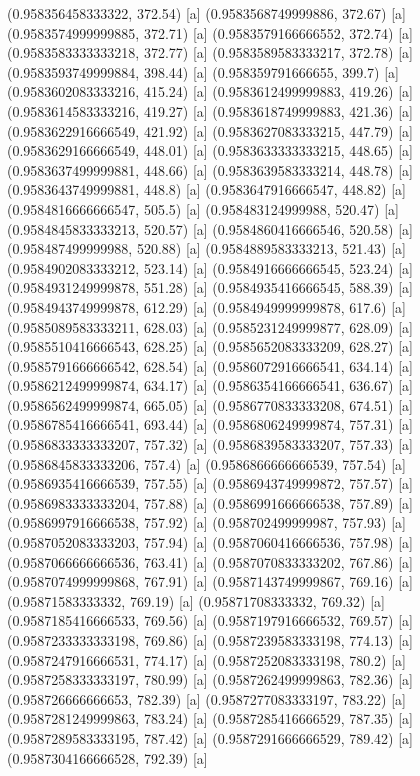{{{(0.958356458333322, 372.54) [a] 
(0.9583568749999886, 372.67) [a] 
(0.9583574999999885, 372.71) [a] 
(0.9583579166666552, 372.74) [a] 
(0.9583583333333218, 372.77) [a] 
(0.9583589583333217, 372.78) [a] 
(0.9583593749999884, 398.44) [a] 
(0.958359791666655, 399.7) [a] 
(0.9583602083333216, 415.24) [a] 
(0.9583612499999883, 419.26) [a] 
(0.9583614583333216, 419.27) [a] 
(0.9583618749999883, 421.36) [a] 
(0.9583622916666549, 421.92) [a] 
(0.9583627083333215, 447.79) [a] 
(0.9583629166666549, 448.01) [a] 
(0.9583633333333215, 448.65) [a] 
(0.9583637499999881, 448.66) [a] 
(0.9583639583333214, 448.78) [a] 
(0.9583643749999881, 448.8) [a] 
(0.9583647916666547, 448.82) [a] 
(0.9584816666666547, 505.5) [a] 
(0.958483124999988, 520.47) [a] 
(0.9584845833333213, 520.57) [a] 
(0.9584860416666546, 520.58) [a] 
(0.958487499999988, 520.88) [a] 
(0.9584889583333213, 521.43) [a] 
(0.9584902083333212, 523.14) [a] 
(0.9584916666666545, 523.24) [a] 
(0.9584931249999878, 551.28) [a] 
(0.9584935416666545, 588.39) [a] 
(0.9584943749999878, 612.29) [a] 
(0.9584949999999878, 617.6) [a] 
(0.9585089583333211, 628.03) [a] 
(0.9585231249999877, 628.09) [a] 
(0.9585510416666543, 628.25) [a] 
(0.9585652083333209, 628.27) [a] 
(0.9585791666666542, 628.54) [a] 
(0.9586072916666541, 634.14) [a] 
(0.9586212499999874, 634.17) [a] 
(0.9586354166666541, 636.67) [a] 
(0.9586562499999874, 665.05) [a] 
(0.9586770833333208, 674.51) [a] 
(0.9586785416666541, 693.44) [a] 
(0.9586806249999874, 757.31) [a] 
(0.9586833333333207, 757.32) [a] 
(0.9586839583333207, 757.33) [a] 
(0.9586845833333206, 757.4) [a] 
(0.9586866666666539, 757.54) [a] 
(0.9586935416666539, 757.55) [a] 
(0.9586943749999872, 757.57) [a] 
(0.9586983333333204, 757.88) [a] 
(0.9586991666666538, 757.89) [a] 
(0.9586997916666538, 757.92) [a] 
(0.958702499999987, 757.93) [a] 
(0.9587052083333203, 757.94) [a] 
(0.9587060416666536, 757.98) [a] 
(0.9587066666666536, 763.41) [a] 
(0.9587070833333202, 767.86) [a] 
(0.9587074999999868, 767.91) [a] 
(0.9587143749999867, 769.16) [a] 
(0.95871583333332, 769.19) [a] 
(0.95871708333332, 769.32) [a] 
(0.9587185416666533, 769.56) [a] 
(0.9587197916666532, 769.57) [a] 
(0.9587233333333198, 769.86) [a] 
(0.9587239583333198, 774.13) [a] 
(0.9587247916666531, 774.17) [a] 
(0.9587252083333198, 780.2) [a] 
(0.9587258333333197, 780.99) [a] 
(0.9587262499999863, 782.36) [a] 
(0.958726666666653, 782.39) [a] 
(0.9587277083333197, 783.22) [a] 
(0.9587281249999863, 783.24) [a] 
(0.9587285416666529, 787.35) [a] 
(0.9587289583333195, 787.42) [a] 
(0.9587291666666529, 789.42) [a] 
(0.9587304166666528, 792.39) [a] 
}}}
